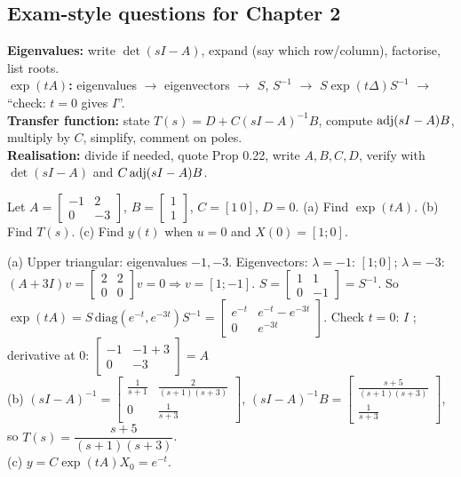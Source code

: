 \subsection{Exam-style questions for Chapter 2}\label{ss:2-11}
\begin{answerbox}
\textbf{Eigenvalues:} write $\det(sI-A)$, expand (say which row/column), factorise, list roots.\\
\textbf{$\exp(tA)$:} eigenvalues $\to$ eigenvectors $\to$ $S$, $S^{-1}$ $\to$ $S\exp(t\Delta)S^{-1}$ $\to$ ``check: $t=0$ gives $I$''.\\
\textbf{Transfer function:} state $T(s)=D+C(sI-A)^{-1}B$, compute $\operatorname{adj}(sI-A)B$, multiply by $C$, simplify, comment on poles.\\
\textbf{Realisation:} divide if needed, quote Prop 0.22, write $A,B,C,D$, verify with $\det(sI-A)$ and $C\operatorname{adj}(sI-A)B$.
\end{answerbox}
\begin{qbox}[title={Q2.1 (standard)}]
Let $A=\begin{bmatrix}-1&2\\0&-3\end{bmatrix}$, $B=\begin{bmatrix}1\\1\end{bmatrix}$, $C=[1\ 0]$, $D=0$.
(a) Find $\exp(tA)$. (b) Find $T(s)$. (c) Find $y(t)$ when $u=0$ and $X(0)=[1;0]$.
\end{qbox}
\begin{solbox}
(a) Upper triangular: eigenvalues $-1,-3$. Eigenvectors: $\lambda=-1$: $[1;0]$; $\lambda=-3$: $(A+3I)v=\begin{bmatrix}2&2\\0&0\end{bmatrix}v=0\Rightarrow v=[1;-1]$.
$S=\begin{bmatrix}1&1\\0&-1\end{bmatrix}=S^{-1}$. So
$\exp(tA)=S\,\mathrm{diag}(e^{-t},e^{-3t})S^{-1}=\begin{bmatrix}e^{-t}&e^{-t}-e^{-3t}\\0&e^{-3t}\end{bmatrix}$. Check $t=0$: $I$ \checkmark; derivative at 0: $\begin{bmatrix}-1&-1+3\\0&-3\end{bmatrix}=A$ \checkmark\\
(b) $(sI-A)^{-1}=\begin{bmatrix}\frac1{s+1}&\frac{2}{(s+1)(s+3)}\\0&\frac1{s+3}\end{bmatrix}$, $(sI-A)^{-1}B=\begin{bmatrix}\frac{s+5}{(s+1)(s+3)}\\\frac1{s+3}\end{bmatrix}$, so $T(s)=\dfrac{s+5}{(s+1)(s+3)}$.\\
(c) $y=C\exp(tA)X_0=e^{-t}$.
\end{solbox}

